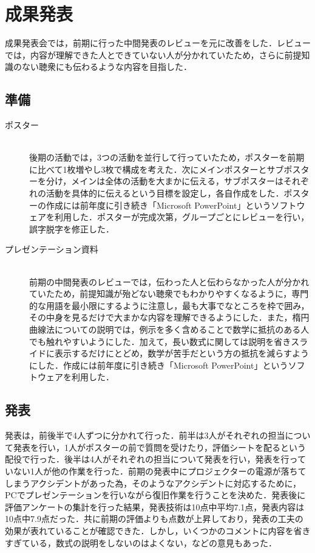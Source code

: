\documentclass[openany,11pt,papersize]{jsbook}
\begin{document}
\section{成果発表}
成果発表会では，前期に行った中間発表のレビューを元に改善をした．レビューでは，内容が理解できた人とできていない人が分かれていたため，さらに前提知識のない聴衆にも伝わるような内容を目指した．

\subsection{準備}
\begin{description}
\item[ポスター]\mbox{}\\
後期の活動では，3つの活動を並行して行っていたため，ポスターを前期に比べて1枚増やし3枚で構成を考えた．次にメインポスターとサブポスターを分け，メインは全体の活動を大まかに伝える，サブポスターはそれぞれの活動を具体的に伝えるという目標を設定し，各自作成をした．ポスターの作成には前年度に引き続き「Microsoft PowerPoint」というソフトウェアを利用した．ポスターが完成次第，グループごとにレビューを行い，誤字脱字を修正した．

\item[プレゼンテーション資料]\mbox{}\\
前期の中間発表のレビューでは，伝わった人と伝わらなかった人が分かれていたため，前提知識が殆どない聴衆でもわかりやすくなるように，専門的な用語を最小限にするように注意し，最も大事でなところを枠で囲み，その中身を見るだけで大まかな内容を理解できるようにした．また，楕円曲線法についての説明では，例示を多く含めることで数学に抵抗のある人でも触れやすいようにした．加えて，長い数式に関しては説明を省きスライドに表示するだけにとどめ，数学が苦手だという方の抵抗を減らすようにした．作成には前年度に引き続き「Microsoft PowerPoint」というソフトウェアを利用した．

\end{description}

\subsection{発表}
発表は，前後半で4人ずつに分かれて行った．前半は3人がそれぞれの担当について発表を行い，1人がポスターの前で質問を受けたり，評価シートを配るという配役で行った．後半は4人がそれぞれの担当について発表を行い，発表を行っていない1人が他の作業を行った．前期の発表中にプロジェクターの電源が落ちてしまうアクシデントがあった為，そのようなアクシデントに対応するために，PCでプレゼンテーションを行いながら復旧作業を行うことを決めた．発表後に評価アンケートの集計を行った結果，発表技術は10点中平均7.1点，発表内容は10点中7.9点だった．共に前期の評価よりも点数が上昇しており，発表の工夫の効果が表れていることが確認できた．しかし，いくつかのコメントに内容を省きすぎている，数式の説明をしないのはよくない，などの意見もあった．

\end{document}
